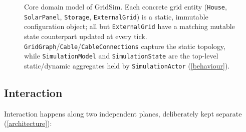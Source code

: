 \documentclass{scrreprt}
\begin{document}
\begin{figure}[H]
{%
}
\caption{Core domain model of GridSim. Each concrete grid entity (\texttt{House},
\texttt{SolarPanel}, \texttt{Storage}, \texttt{ExternalGrid}) is a static, immutable configuration
object; all but \texttt{ExternalGrid} have a matching mutable state counterpart updated at every
tick. \texttt{GridGraph}/\texttt{Cable}/\texttt{CableConnections} capture the static topology, while
\texttt{SimulationModel} and \texttt{SimulationState} are the top-level static/dynamic aggregates
held by \texttt{SimulationActor} (\cref{behaviour}).}
\label{fig:domain-model-classes}
\end{figure}

\subsection{Interaction}\label{interaction}

Interaction happens along two independent planes, deliberately kept separate (\cref{architecture}):
\end{document}

